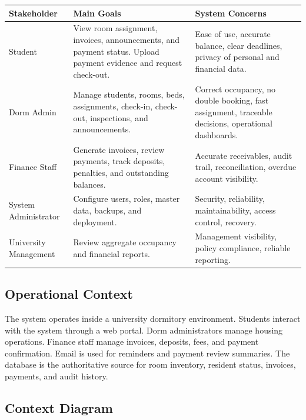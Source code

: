 \documentclass[11pt,a4paper]{article}
\begin{document}
\begin{longtable}{L{0.20\textwidth} L{0.31\textwidth} L{0.36\textwidth}}
\toprule
\textbf{Stakeholder} & \textbf{Main Goals} & \textbf{System Concerns}\\
\midrule
\endhead
Student & View room assignment, invoices, announcements, and payment status. Upload payment evidence and request check-out. & Ease of use, accurate balance, clear deadlines, privacy of personal and financial data.\\
Dorm Admin & Manage students, rooms, beds, assignments, check-in, check-out, inspections, and announcements. & Correct occupancy, no double booking, fast assignment, traceable decisions, operational dashboards.\\
Finance Staff & Generate invoices, review payments, track deposits, penalties, and outstanding balances. & Accurate receivables, audit trail, reconciliation, overdue account visibility.\\
System Administrator & Configure users, roles, master data, backups, and deployment. & Security, reliability, maintainability, access control, recovery.\\
University Management & Review aggregate occupancy and financial reports. & Management visibility, policy compliance, reliable reporting.\\
\bottomrule
\end{longtable}

\subsection{Operational Context}
The system operates inside a university dormitory environment. Students interact with the system through a web portal. Dorm administrators manage housing operations. Finance staff manage invoices, deposits, fees, and payment confirmation. Email is used for reminders and payment review summaries. The database is the authoritative source for room inventory, resident status, invoices, payments, and audit history.

\subsection{Context Diagram}
\end{document}
